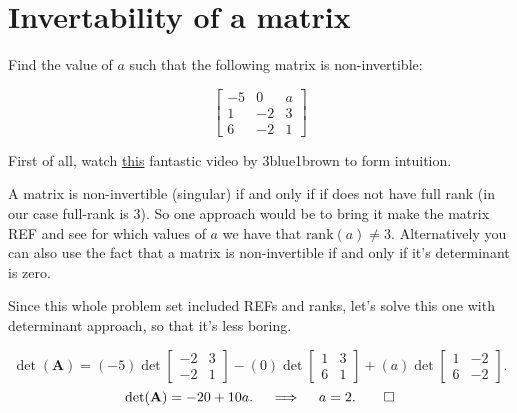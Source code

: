

\section{Invertability of a matrix}
\begin{problem}%
    Find the value of $a$ such that the following matrix is non-invertible:

        \[ \begin{bmatrix}
            -5 & 0 & a \\ 1 & -2 & 3 \\ 6 & -2 & 1 
        \end{bmatrix} \]
\end{problem}
\begin{solution}
    First of all, watch \href{https://www.youtube.com/watch?v=uQhTuRlWMxw}{this} fantastic video by 3blue1brown to form intuition. 

    A matrix is non-invertible (singular) if and only if if does not have full rank (in our case full-rank is 3). So one approach would be to bring it make the matrix REF and see for which values of $a$ we have that $\text{rank}(a) \neq 3$. Alternatively you can also use the fact that a matrix is non-invertible if and only if it's determinant is zero.

    Since this whole problem set included REFs and ranks, let's solve this one with determinant approach, so that it's less boring.

    \[
\det(\mathbf{A}) = (-5) \det\begin{bmatrix} -2 & 3 \\ -2 & 1 \end{bmatrix} - 
(0) \det\begin{bmatrix} 1 & 3 \\ 6 & 1 \end{bmatrix} + 
(a) \det\begin{bmatrix} 1 & -2 \\ 6 & -2 \end{bmatrix}.
\]
\[
\det(\mathbf{A}) = -20 + 10a.  \quad \implies \quad a = 2. \qed
\]
\end{solution}

